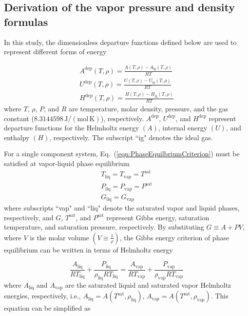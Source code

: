 \documentclass[5p,times]{elsarticle}
\begin{document}
\subsection{Derivation of the vapor pressure and density formulas}
In this study, the dimensionless departure functions defined below are used to represent different forms of energy

\begin{equation}
\begin{array}{l}
{
A^\mathrm{dep}(T,\rho)=  \frac{A(T,\rho)-A_\mathrm{ig}(T,\rho)}{RT} 
}
\\
{
U^\mathrm{dep}(T,\rho)=  \frac{ U(T,\rho)-U_\mathrm{ig}(T,\rho)}{RT} 
}
\\
{
H^\mathrm{dep}(T,\rho)=  \frac{ H(T,\rho)-H_\mathrm{ig}(T,\rho)}{RT} 
}
\end{array} 
\label{eqn:DepDefinition}
\end{equation}
where $T$, $\rho$, $P$, and $R$ are temperature, molar density, pressure, and the gas constant ($8.3144598\,\mathrm{J/(mol\,K)}$), respectively. $A^\mathrm{dep}$, $U^\mathrm{dep}$, and $H^\mathrm{dep}$ represent departure functions for the Helmholtz energy $(A)$, internal energy $(U)$, and enthalpy $(H)$, respectively. The subscript ``ig" denotes the ideal gas.

For a single component system, Eq.~(\ref{eqn:PhaseEquilbriumCriterion}) must be satisfied at vapor-liquid phase equilibrium
\begin{equation}
\begin{array}{l}
{T_\mathrm{liq} =T_\mathrm{vap} = T^\mathrm{sat} }\\
{P_\mathrm{liq} =P_\mathrm{vap} = P^\mathrm{sat} }\\
{G_\mathrm{liq} =G_\mathrm{vap} }
\end{array} 
\label{eqn:PhaseEquilbriumCriterion}
\end{equation}
where subscripts ``vap" and ``liq" denote the saturated vapor and liquid phases, respectively, and $G$, $T^\mathrm{sat}$, and $P^\mathrm{sat}$ represent Gibbs energy, saturation temperature, and saturation pressure, respectively. By substituting $G \equiv A+PV$, where $V$ is the molar volume $\left(V \equiv \frac{1}{\rho}\right)$, the Gibbs energy criterion of phase equilibrium can be written in terms of Helmholtz energy 

\begin{equation}
\frac{A_\mathrm{liq}}{RT_\mathrm{liq}} + \frac{P_\mathrm{liq}}{\rho_\mathrm{liq}RT_\mathrm{liq}}=\frac{A_\mathrm{vap}}{RT_\mathrm{vap}} + \frac{P_\mathrm{vap}}{\rho_\mathrm{vap}RT_\mathrm{vap}}
\label{eqn:ACriterion}
\end{equation}
where $A_\mathrm{liq}$ and $A_\mathrm{vap}$ are the saturated liquid and saturated vapor Helmholtz energies, respectively, i.e., $A_\mathrm{liq}=A(T^\mathrm{sat},\rho_\mathrm{liq})$, $A_\mathrm{vap}=A(T^\mathrm{sat},\rho_\mathrm{vap})$.
This equation can be simplified as
\end{document}
